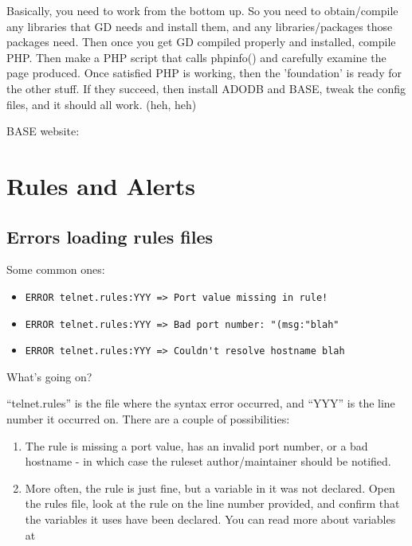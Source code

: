 \documentclass{article}
\begin{document}
Basically, you need to work from the bottom up. So you need to obtain/compile
any libraries that GD needs and install them, and any libraries/packages those
packages need. Then once you get GD compiled properly and installed, compile
PHP. Then make a PHP script that calls phpinfo() and carefully examine the page
produced. Once satisfied PHP is working, then the 'foundation' is ready for the
other stuff. If they succeed, then install ADODB and BASE, tweak the config
files, and it should all work. (heh, heh)

BASE website: 

\section{Rules and Alerts}

\subsection{Errors loading rules files}

Some common ones:

\begin{itemize}
\item \begin{verbatim}ERROR telnet.rules:YYY => Port value missing in rule!\end{verbatim}
\item \begin{verbatim}ERROR telnet.rules:YYY => Bad port number: "(msg:"blah"\end{verbatim}
\item \begin{verbatim}ERROR telnet.rules:YYY => Couldn't resolve hostname blah\end{verbatim}
\end{itemize}

What's going on?

``telnet.rules'' is the file where the syntax error occurred, and ``YYY'' is the 
line number it occurred on.  There are a couple of possibilities:

\begin{enumerate}
\item The rule is missing a port value, has an invalid port number, or a bad hostname - in which case the ruleset author/maintainer should be notified.

\item More often, the rule is just fine, but a variable in it was not declared.  Open the rules file, look at the rule on the line number provided, and confirm that the variables it uses have been declared.  You can read more about variables at 
\end{enumerate}
\end{document}
